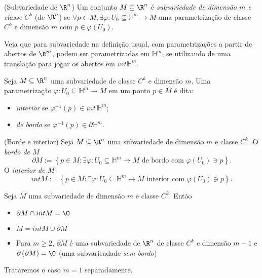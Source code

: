\begin{definition}
    (Subvariedade de $\R^{n}$) Um conjunto $M\subseteq\R^{n}$ é \emph{subvariedade de dimensão $m$ e classe $C^{k}$} (de $\R^{n}$) se $\forall p\in M, \exists \varphi : U_0\subseteq\mathbb{H}^{m} \longrightarrow M$ uma parametrização de classe $C^{k}$ e dimensão $m$ com $p\in \varphi \left( U_0 \right) $.
\end{definition}

Veja que para subvariedade na definição usual, com parametrizações a partir de abertos de $\R^{m}$, podem ser parametrizadas em $\mathbb{H}^{m}$, se utilizando de uma translação para jogar os abertos em $int \mathbb{H}^{m}$.

\begin{definition}
    Seja $M\subseteq\R^{n}$ uma subvariedade de classe $C^{k}$ e dimensão $m$. Uma parametrização $\varphi : U_0\subseteq\mathbb{H}^{m} \longrightarrow M$ em um ponto $p \in M$ é dita:
    \begin{itemize}
        \item \emph{interior} se $\varphi ^{-1}\left( p \right) \in  int \, \mathbb{H}^{m}$;
	\item \emph{de bordo} se $\varphi ^{-1}\left( p \right) \in \partial \mathbb{H}^{m}$.
    \end{itemize}
\end{definition}

\begin{definition}
    (Borde e interior) Seja $M\subseteq\R^{n}$ uma subvariedade de dimensão $m$ e classe $C^{k}$. O \emph{bordo de $M$} \[
    \partial M := \left\{ p\in M: \exists \varphi : U_0\subseteq\mathbb{H}^{m} \longrightarrow M \text{ de bordo com }\varphi \left( U_0 \right) \ni p \right\} 
    .\] O \emph{interior de $M$} \[
    int M := \left\{ p \in M : \exists \varphi : U_0\subseteq\mathbb{H}^{m} \longrightarrow M \text{ interior com } \varphi \left( U_0 \right) \ni p\right\} 
    .\] 
\end{definition}

\begin{theorem}
    Seja $M$ uma subvariedade de dimensão $m$ e classe $C^{k}$. Então
    \begin{itemize}
        \item $\partial M \cap int M = \O$
	\item $M = int M \dot{\cup } \partial M$
	\item Para $m\ge 2$, $\partial M$ é uma subvariedade de $\R^{n}$ de classe $C^{k}$ e dimensão $m-1$ e $\partial \left( \partial M \right) = \O$ (uma subvarieadade \emph{sem bordo})
    \end{itemize}
\end{theorem}

Trataremos o caso $m=1$ separadamente.

